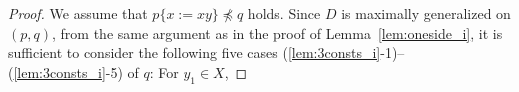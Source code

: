 \begin{proof}
We assume that $p \{ x := xy \} \not\preceq q$ holds. 
%
%
%
%
Since $D$ is maximally generalized on $(p,q)$, from the same argument as in the proof of Lemma~\ref{lem:oneside_i}, it is sufficient to consider the following five cases (\ref{lem:3consts_i}-1)--(\ref{lem:3consts_i}-5) of $q$: For $y_{1} \in X$,


\end{proof}
